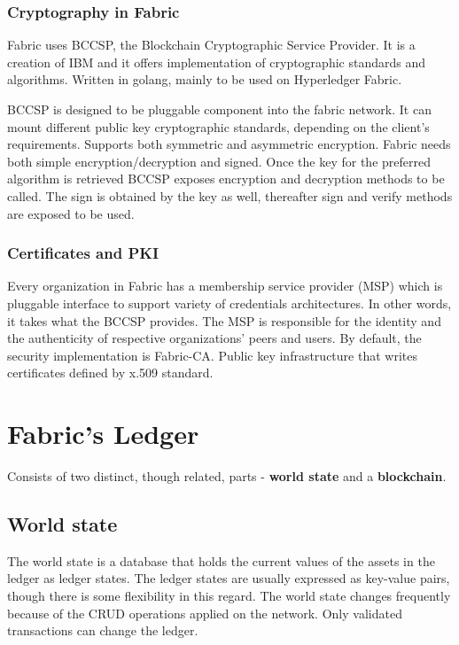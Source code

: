 \documentclass[a4paper,11pt]{report}
\begin{document}
\subsubsection{Cryptography in Fabric }

	Fabric uses BCCSP, the Blockchain Cryptographic Service Provider. It is a creation of IBM and it offers implementation of cryptographic standards and algorithms. Written in golang, mainly to be used on Hyperledger Fabric. 

	BCCSP is designed to be pluggable component into the fabric network. It can mount different public key cryptographic standards, depending on the client's requirements. Supports both symmetric and asymmetric encryption. 
Fabric needs both simple encryption/decryption and signed. Once the key for the preferred algorithm is retrieved BCCSP exposes encryption and decryption methods to be called. The sign is obtained by the key as well, thereafter sign and verify methods are exposed to be used. \cite{bccsp}


\subsubsection{Certificates and PKI}
	Every organization in Fabric has a membership service provider (MSP) which is pluggable interface to support variety of credentials architectures. In other words, it takes what the BCCSP provides. The MSP is responsible for the identity and the authenticity of respective organizations' peers and users. By default, the security implementation is Fabric-CA. Public key infrastructure that writes certificates defined by x.509 standard.


\section{Fabric's Ledger}
\label{fLedger}
	Consists of two distinct, though related, parts - \textbf{world state} and  a \textbf{blockchain}.
	
\subsection{World state}
\label{ws}
The world state is a database that holds the current values of the assets in the ledger as ledger states. The ledger states are usually expressed as key-value pairs, though there is some flexibility in this regard. The world state changes frequently because of the CRUD operations applied on the network. Only validated transactions can change the ledger.
\end{document}
